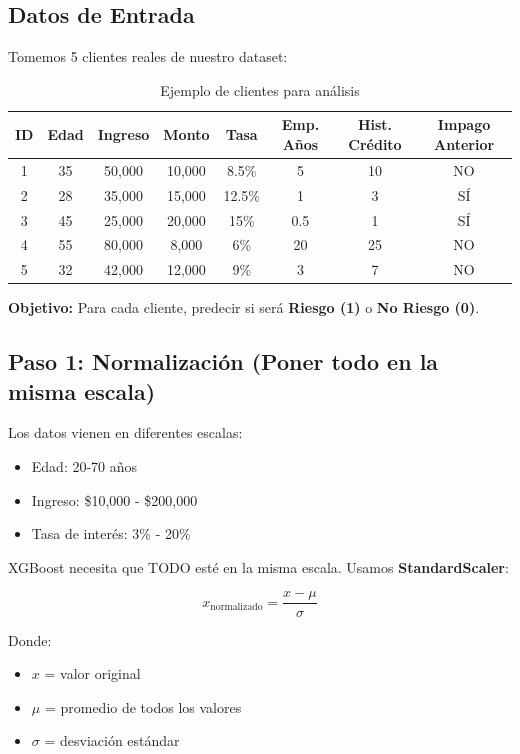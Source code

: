 \documentclass[11pt,a4paper,spanish]{article}
\begin{document}
\subsection{Datos de Entrada}

Tomemos 5 clientes reales de nuestro dataset:

\begin{table}[H]
\centering
\begin{tabular}{|c|c|c|c|c|c|c|c|}
\hline
\textbf{ID} & \textbf{Edad} & \textbf{Ingreso} & \textbf{Monto} & \textbf{Tasa} & \textbf{Emp. Años} & \textbf{Hist. Crédito} & \textbf{Impago Anterior} \\
\hline
1 & 35 & 50,000 & 10,000 & 8.5\% & 5 & 10 & NO \\
\hline
2 & 28 & 35,000 & 15,000 & 12.5\% & 1 & 3 & SÍ \\
\hline
3 & 45 & 25,000 & 20,000 & 15\% & 0.5 & 1 & SÍ \\
\hline
4 & 55 & 80,000 & 8,000 & 6\% & 20 & 25 & NO \\
\hline
5 & 32 & 42,000 & 12,000 & 9\% & 3 & 7 & NO \\
\hline
\end{tabular}
\caption{Ejemplo de clientes para análisis}
\end{table}

\textbf{Objetivo:} Para cada cliente, predecir si será \textbf{Riesgo (1)} o \textbf{No Riesgo (0)}.

\subsection{Paso 1: Normalización (Poner todo en la misma escala)}

Los datos vienen en diferentes escalas:
\begin{itemize}
    \item Edad: 20-70 años
    \item Ingreso: \$10,000 - \$200,000
    \item Tasa de interés: 3\% - 20\%
\end{itemize}

XGBoost necesita que TODO esté en la misma escala. Usamos \textbf{StandardScaler}:

\[
x_{\text{normalizado}} = \frac{x - \mu}{\sigma}
\]

Donde:
\begin{itemize}
    \item $x$ = valor original
    \item $\mu$ = promedio de todos los valores
    \item $\sigma$ = desviación estándar
\end{itemize}
\end{document}
